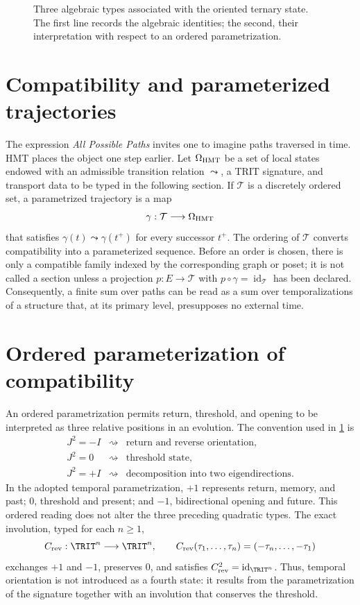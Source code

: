 \begin{figure}[H]
\centering
\resizebox{\textwidth}{!}{}
\caption{Three algebraic types associated with the oriented ternary state. The
first line records the algebraic identities; the second, their interpretation
with respect to an ordered parametrization.}
\label{fig:trit-atlas}
\end{figure}

\section{Compatibility and parameterized trajectories}

The expression \emph{All Possible Paths} invites one to imagine paths traversed in
time. HMT places the object one step earlier. Let \(\Omega_{\rm HMT}\) be a
set of local states endowed with an admissible transition relation
\(\leadsto\), a TRIT signature, and transport data to be typed in the
following section. If
\(\mathcal T\) is a discretely ordered set, a parametrized trajectory
is a map
\[
\gamma:\mathcal T\longrightarrow\Omega_{\rm HMT}
\]
that satisfies \(\gamma(t)\leadsto\gamma(t^+)\) for every successor \(t^+\).
The ordering of \(\mathcal T\) converts compatibility into a parameterized
sequence. Before an order is chosen, there is only a compatible family
indexed by the corresponding graph or poset; it is not called a section unless
a projection \(p:E\to\mathcal T\) with
\(p\circ\gamma=\operatorname{id}_{\mathcal T}\) has been declared.
Consequently, a finite sum over paths can be read as a sum over
temporalizations of a structure that, at its primary level, presupposes no
external time.

\section{Ordered parameterization of compatibility}

An ordered parametrization permits return, threshold, and opening
to be interpreted as three relative positions in an evolution. The convention used in
\cref{fig:trit-atlas} is
\[
\begin{array}{ccl}
J^2=-I&\rightsquigarrow&\text{return and reverse orientation},\\
J^2=0&\rightsquigarrow&\text{threshold state},\\
J^2=+I&\rightsquigarrow&\text{decomposition into two eigendirections}.
\end{array}
\]
In the adopted temporal parametrization, \(+1\) represents
return, memory, and past; \(0\), threshold and present; and \(-1\), bidirectional
opening and future. This ordered reading does not alter the three preceding
quadratic types.
The exact involution, typed for each \(n\geq1\),
\[
C_{\rm rev}:\TRIT^n\longrightarrow\TRIT^n,
\qquad
C_{\rm rev}(\tau_1,\ldots,\tau_n)=(-\tau_n,\ldots,-\tau_1)
\]
exchanges \(+1\) and \(-1\), preserves \(0\), and satisfies
\(C_{\rm rev}^2=\operatorname{id}_{\TRIT^n}\).
Thus, temporal orientation is not introduced as a fourth state: it results
from the parametrization of the signature together with an involution that conserves the
threshold.

